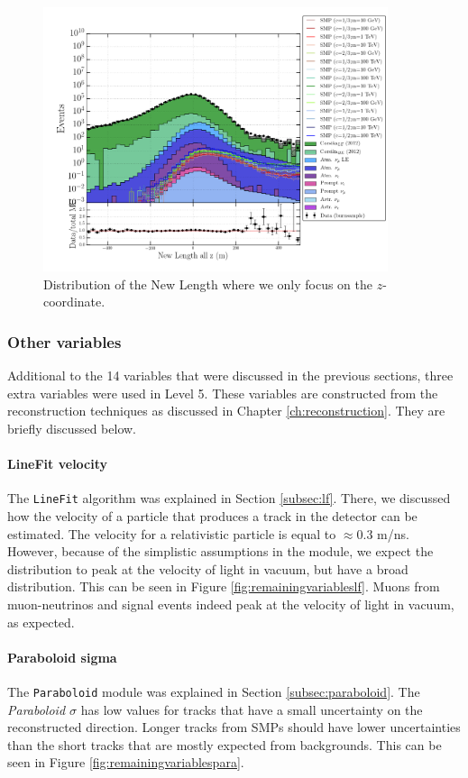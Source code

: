 \begin{figure}
\centering
\includegraphics[width=0.9\textwidth]{chapter8/img/1D_stack_newlength_all_z.png}
\caption{Distribution of the New Length where we only focus on the $z$-coordinate.}
\label{fig:newvariablesnewlengthallz}
\end{figure}


\subsubsection{Other variables}
\label{subsub:other}
Additional to the 14 variables that were discussed in the previous sections, three extra variables were used in Level 5. These variables are constructed from the reconstruction techniques as discussed in Chapter \ref{ch:reconstruction}. They are briefly discussed below.

\paragraph{LineFit velocity}
The \texttt{LineFit} algorithm was explained in Section \ref{subsec:lf}. There, we discussed how the velocity of a particle that produces a track in the detector can be estimated. The velocity for a relativistic particle is equal to $\approx$0.3 m/ns. However, because of the simplistic assumptions in the module, we expect the distribution to peak at the velocity of light in vacuum, but have a broad distribution. This can be seen in Figure \ref{fig:remainingvariableslf}. Muons from muon-neutrinos and signal events indeed peak at the velocity of light in vacuum, as expected.

\paragraph{Paraboloid sigma}
The \texttt{Paraboloid} module was explained in Section \ref{subsec:paraboloid}. The \textit{Paraboloid $\sigma$} has low values for tracks that have a small uncertainty on the reconstructed direction. Longer tracks from SMPs should have lower uncertainties than the short tracks that are mostly expected from backgrounds. This can be seen in Figure \ref{fig:remainingvariablespara}.


